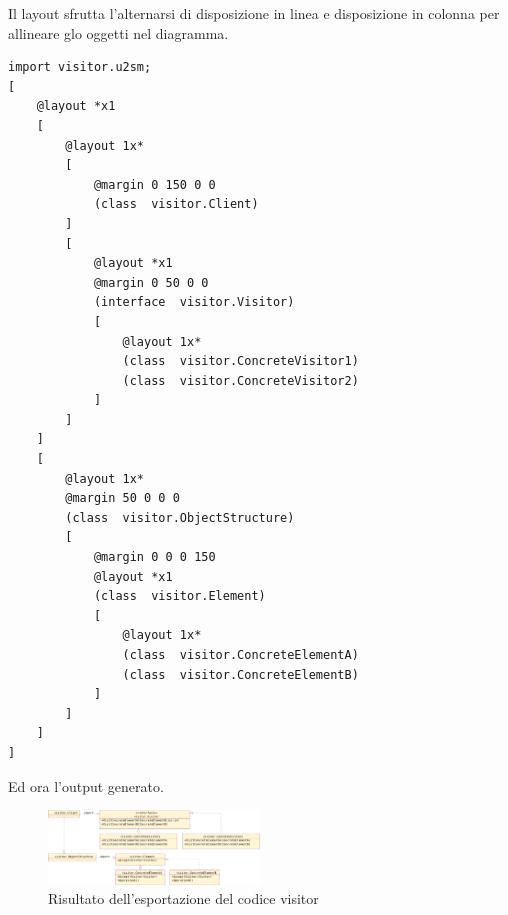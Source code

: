Il layout sfrutta l'alternarsi di disposizione in linea e disposizione in
colonna per allineare glo oggetti nel diagramma.

\begin{lstlisting}[style=layout, caption={Il Layout}]
import visitor.u2sm;
[	
	@layout *x1
	[
		@layout 1x*
		[
			@margin 0 150 0 0
			(class	visitor.Client)
		]
		[
			@layout *x1
			@margin 0 50 0 0
			(interface	visitor.Visitor)
			[
				@layout 1x*
				(class	visitor.ConcreteVisitor1)
				(class	visitor.ConcreteVisitor2)
			]
		]
	]
	[
		@layout 1x*
		@margin 50 0 0 0
		(class	visitor.ObjectStructure)
		[
			@margin 0 0 0 150
			@layout *x1
			(class	visitor.Element)
			[
				@layout 1x*
				(class	visitor.ConcreteElementA)
				(class	visitor.ConcreteElementB)
			]
		]
	]
]
\end{lstlisting}

Ed ora l'output generato.

\begin{figure}[htp]
\begin{center}
  \includegraphics[angle=90,width=0.5\textwidth]{img/visitor}
  \caption[labelInTOC]{Risultato dell'esportazione del codice visitor}
\end{center}
\end{figure}



